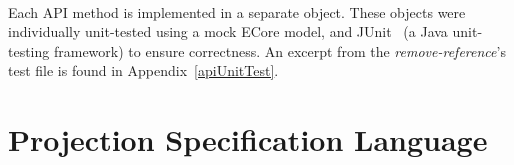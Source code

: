\documentclass{article}
\begin{document}
{\\
Each API method is implemented in a separate object. These objects were individually unit-tested using a mock ECore model, and JUnit~\cite{junit} (a Java unit-testing framework) to ensure correctness. An excerpt from the \emph{remove-reference}'s test file is found in Appendix~\ref{apiUnitTest}.
\newpage
\section{Projection Specification Language}\label{EditorLanguage}
}
\end{document}
